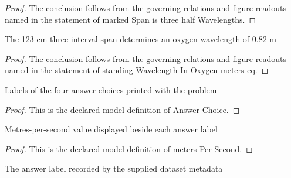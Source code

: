\begin{proof}
  The conclusion follows from the governing relations and figure readouts named in the statement of marked Span is three half Wavelengths.
\end{proof}
\begin{lemma}
  \label{lem:physics:phyx-mini-0183:phyxminiproblems-problemphyxmini0183-standingwavelengthinoxygen-meters-eq}
  The 123 cm three-interval span determines an oxygen wavelength of 0.82 m
\end{lemma}
\begin{proof}
  The conclusion follows from the governing relations and figure readouts named in the statement of standing Wavelength In Oxygen meters eq.
\end{proof}
\begin{definition}
  \label{def:physics:phyx-mini-0183:phyxminiproblems-problemphyxmini0183-answerchoice}
  Labels of the four answer choices printed with the problem
\end{definition}
\begin{proof}
  This is the declared model definition of Answer Choice.
\end{proof}
\begin{definition}
  \label{def:physics:phyx-mini-0183:phyxminiproblems-problemphyxmini0183-answerchoice-meterspersecond}
  Metres-per-second value displayed beside each answer label
\end{definition}
\begin{proof}
  This is the declared model definition of meters Per Second.
\end{proof}
\begin{definition}
  \label{def:physics:phyx-mini-0183:phyxminiproblems-problemphyxmini0183-recordedanswerchoice}
  The answer label recorded by the supplied dataset metadata
\end{definition}
